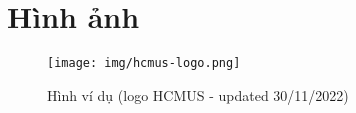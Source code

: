 \section{Hình ảnh}
\begin{figure}[H]
    \centering
    \texttt{[image: img/hcmus-logo.png]}
    \caption{Hình ví dụ (logo HCMUS - updated 30/11/2022)}
    \label{fig:my_label}
\end{figure}


